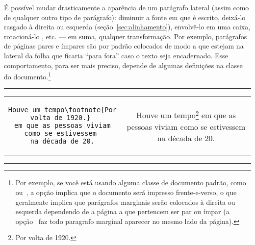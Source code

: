 É possível mudar drasticamente
a aparência de um parágrafo lateral (assim como de qualquer outro tipo
de parágrafo): diminuir a fonte em que é escrito, deixá-lo rasgado à
direita ou esquerda (seção~\ref{sec:alinhamento}),
envolvê-lo em uma caixa,
rotacioná-lo%
,
etc. --- em suma, qualquer transformação. Por exemplo, parágrafos de
páginas pares e ímpares são por padrão colocados de modo a que estejam
na lateral da folha que ficaria ``para fora'' caso o texto seja
encadernado. Esse comportamento, para ser mais preciso, depende de
algumas definições na classe do documento.\footnote{Por exemplo, se
  você está usando alguma  classe de documento padrão,
  como~ ou~, a opção
   implica que o documento será impresso
  frente-e-verso, o que geralmente implica que parágrafos marginais
  serão colocados à direita ou esquerda dependendo de a página a que
  pertencem ser par ou ímpar (a opção~ faz todo
  paragrafo marginal aparecer no mesmo lado da página).}


\begin{center}\footnotesize\hrule\nopagebreak\smallskip
\begin{tabular}{c|c}
\begin{minipage}{.47\textwidth}
\begin{verbatim}
Houve um tempo\footnote{Por volta de 1920.} 
em que as pessoas viviam como se estivessem 
na década de 20.
\end{verbatim}
\vfill
\end{minipage} &
\begin{minipage}{.47\textwidth}
Houve um tempo\footnote{Por volta de 1920.} em
que as pessoas viviam como se estivessem na 
década de 20.
\vspace*{1cm}
\end{minipage}\nobreak
\end{tabular}%
\nobreak\smallskip\nobreak\hrule
\end{center}



